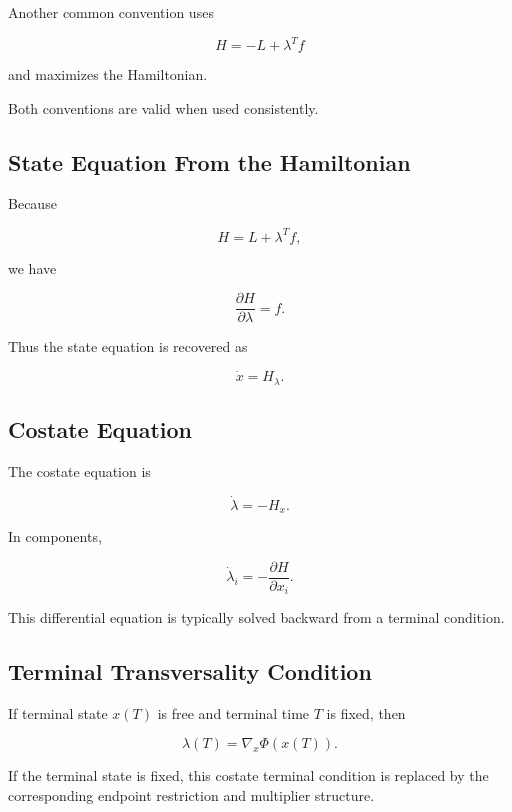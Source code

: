 Another common convention uses

\[
H
=
-L+\lambda^Tf
\]

and maximizes the Hamiltonian.

Both conventions are valid when used consistently.

\subsection{State Equation From the Hamiltonian}
\label{subsec:hamiltonian-state-equation}

Because

\[
H
=
L+\lambda^Tf,
\]

we have

\[
\frac{\partial H}{\partial\lambda}
=
f.
\]

Thus the state equation is recovered as

\[
\boxed{
\dot{x}
=
H_{\lambda}.
}
\]

\subsection{Costate Equation}
\label{subsec:costate-equation}

The costate equation is

\[
\boxed{
\dot{\lambda}
=
-
H_x.
}
\]

In components,

\[
\boxed{
\dot{\lambda}_i
=
-
\frac{\partial H}{\partial x_i}.
}
\]

This differential equation is typically solved backward from a terminal
condition.

\subsection{Terminal Transversality Condition}
\label{subsec:terminal-transversality}

If terminal state \(x(T)\) is free and terminal time \(T\) is fixed, then

\[
\boxed{
\lambda(T)
=
\nabla_x
\Phi
(
x(T)
).
}
\]

If the terminal state is fixed, this costate terminal condition is replaced
by the corresponding endpoint restriction and multiplier structure.


